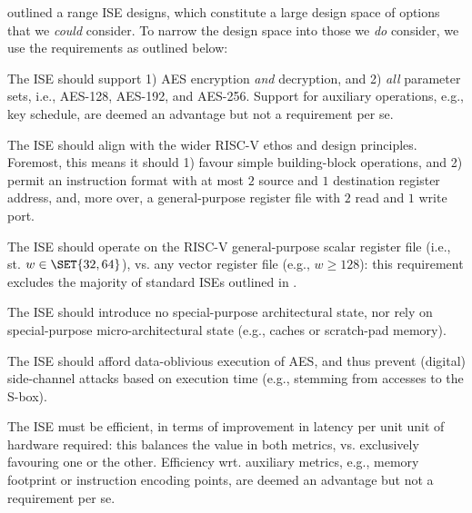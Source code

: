 
outlined a range ISE designs, which constitute a large design space of
options that we {\em could} consider.  To narrow the design space into
those we {\em do} consider, we use the requirements as outlined below:

\begin{requirement}\label{req:1}
The ISE should support
1) AES encryption {\em and} decryption,
   and
2) {\em all} parameter sets, i.e., AES-128, AES-192, and AES-256.
Support for 
auxiliary operations, e.g., key schedule, 
are deemed an advantage but not a requirement per se.
\end{requirement}

\begin{requirement}\label{req:2}
The ISE should align with the wider RISC-V ethos and design principles.
Foremost, this means it should 
1) favour simple building-block operations,
   and
2) permit an instruction format with at most $2$ source and $1$ destination register address,
   and, more over, a general-purpose register file with $2$ read and $1$ write port.
\end{requirement}

\begin{requirement}\label{req:3}
The ISE should operate on 
the RISC-V general-purpose scalar register file 
(i.e., st. $w \in \SET{32,64}$),
vs. 
any                        vector register file
(e.g., $w \ge 128$):
this requirement excludes the majority of standard ISEs outlined in 
.
\end{requirement}

\begin{requirement}\label{req:4}
The ISE should introduce no
special-purpose       architectural state, 
nor rely on
special-purpose micro-architectural state
(e.g., caches or scratch-pad memory).
\end{requirement}

\begin{requirement}\label{req:5}
The ISE should afford data-oblivious execution of AES, and thus prevent 
(digital) side-channel attacks based on execution time 
(e.g., stemming from accesses to the S-box).
\end{requirement}

\begin{requirement}
The ISE must be efficient, in terms of improvement in latency per unit
unit of hardware required: this balances the value in both metrics, vs.
exclusively favouring one or the other.
Efficiency wrt. 
auxiliary metrics, e.g., memory footprint or instruction encoding points,
are deemed an advantage but not a requirement per se.
\end{requirement}

